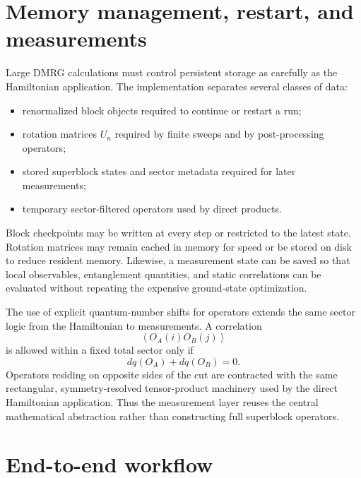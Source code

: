 \documentclass[11pt,a4paper]{article}
\newcommand{\avg}[1]{\left\langle #1\right\rangle}
\begin{document}
\section{Memory management, restart, and measurements}

Large DMRG calculations must control persistent storage as carefully as the
Hamiltonian application.  The implementation separates several classes of
data:
\begin{itemize}
  \item renormalized block objects required to continue or restart a run;
  \item rotation matrices $U_n$ required by finite sweeps and by
        post-processing operators;
  \item stored superblock states and sector metadata required for later
        measurements;
  \item temporary sector-filtered operators used by direct products.
\end{itemize}

Block checkpoints may be written at every step or restricted to the latest
state.  Rotation matrices may remain cached in memory for speed or be stored
on disk to reduce resident memory.  Likewise, a measurement state can be
saved so that local observables, entanglement quantities, and static
correlations can be evaluated without repeating the expensive ground-state
optimization.

The use of explicit quantum-number shifts for operators extends the same
sector logic from the Hamiltonian to measurements.  A correlation
\begin{equation}
  \avg{O_A(i)O_B(j)}
\end{equation}
is allowed within a fixed total sector only if
\begin{equation}
  dq(O_A)+dq(O_B)=0.
\end{equation}
Operators residing on opposite sides of the cut are contracted with the same
rectangular, symmetry-resolved tensor-product machinery used by the direct
Hamiltonian application.  Thus the measurement layer reuses the central
mathematical abstraction rather than constructing full superblock operators.

\section{End-to-end workflow}
\end{document}
